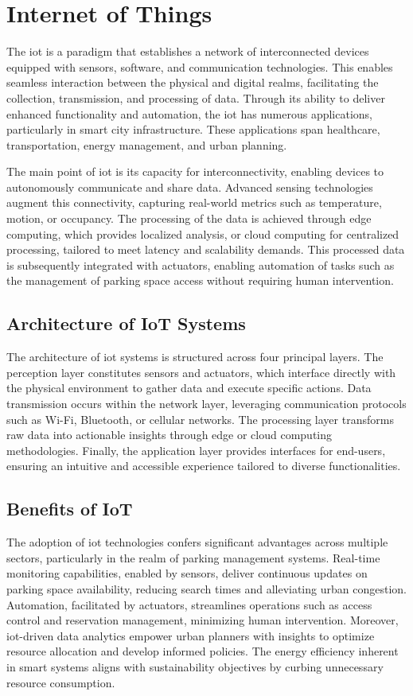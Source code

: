\chapter{Internet of Things}\label{iot}

The \gls{iot} is a paradigm that establishes a network of interconnected devices equipped with sensors, software, and communication technologies. This enables seamless interaction between the physical and digital realms, facilitating the collection, transmission, and processing of data. Through its ability to deliver enhanced functionality and automation, the \gls{iot} has numerous applications, particularly in smart city infrastructure. These applications span healthcare, transportation, energy management, and urban planning.

The main point of \gls{iot} is its capacity for interconnectivity, enabling devices to autonomously communicate and share data. Advanced sensing technologies augment this connectivity, capturing real-world metrics such as temperature, motion, or occupancy. The processing of the data is achieved through edge computing, which provides localized analysis, or cloud computing for centralized processing, tailored to meet latency and scalability demands. This processed data is subsequently integrated with actuators, enabling automation of tasks such as the management of parking space access without requiring human intervention.

\section{Architecture of IoT Systems}
The architecture of \gls{iot} systems is structured across four principal layers. The perception layer constitutes sensors and actuators, which interface directly with the physical environment to gather data and execute specific actions. Data transmission occurs within the network layer, leveraging communication protocols such as Wi-Fi, Bluetooth, or cellular networks. The processing layer transforms raw data into actionable insights through edge or cloud computing methodologies. Finally, the application layer provides interfaces for end-users, ensuring an intuitive and accessible experience tailored to diverse functionalities.

\section{Benefits of IoT}
The adoption of \gls{iot} technologies confers significant advantages across multiple sectors, particularly in the realm of parking management systems. Real-time monitoring capabilities, enabled by sensors, deliver continuous updates on parking space availability, reducing search times and alleviating urban congestion. Automation, facilitated by actuators, streamlines operations such as access control and reservation management, minimizing human intervention. Moreover, \gls{iot}-driven data analytics empower urban planners with insights to optimize resource allocation and develop informed policies. The energy efficiency inherent in smart systems aligns with sustainability objectives by curbing unnecessary resource consumption.

